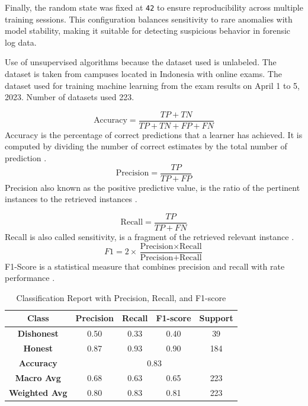 Finally, the random state was fixed at \texttt{42} to ensure reproducibility across multiple training sessions. This configuration balances sensitivity to rare anomalies with model stability, making it suitable for detecting suspicious behavior in forensic log data.


Use of unsupervised algorithms because the dataset used is unlabeled. The dataset is taken from campuses located in Indonesia with online exams. The dataset used for training machine learning from the exam results on April 1 to 5, 2023. Number of datasets used 223.

\begin{equation}
    \text{Accuracy} = \frac{TP + TN}{TP + TN + FP + FN}
\end{equation}
Accuracy is the percentage of correct predictions that a learner has achieved. It is computed by dividing the number of correct estimates by the total number of prediction \citet{smirani2022algorithm}.
\begin{equation}
    \text{Precision} = \frac{TP}{TP + FP}
\end{equation}
Precision also known as the positive predictive value, is the ratio of the pertinent instances to the retrieved instances \citet{smirani2022algorithm}.

\begin{equation}
    \text{Recall} = \frac{TP}{TP + FN}
\end{equation}
Recall is also called sensitivity, is a fragment of the retrieved relevant instance \citet{smirani2022algorithm}.
\begin{equation}
    F1 = 2 \times \frac{\text{Precision} \times \text{Recall}}{\text{Precision} + \text{Recall}}
\end{equation}
F1-Score is a statistical measure that combines precision and recall with rate performance \citet{smirani2022algorithm}.

\begin{table}[H]
    \centering
    \renewcommand{\arraystretch}{1.3} %
    \caption{Classification Report with Precision, Recall, and F1-score}
    \begin{tabular}{|c|c|c|c|c|}
        \hline
        \textbf{Class} & \textbf{Precision} & \textbf{Recall} & \textbf{F1-score} & \textbf{Support} \\
        \hline
        \textbf{Dishonest} & 0.50 & 0.33 & 0.40 & 39 \\
        \textbf{Honest}  & 0.87 & 0.93 & 0.90 & 184 \\
        \hline
        \textbf{Accuracy}  & \multicolumn{4}{c|}{0.83} \\
        \hline
        \textbf{Macro Avg} & 0.68 & 0.63 & 0.65 & 223 \\
        \textbf{Weighted Avg} & 0.80 & 0.83 & 0.81 & 223 \\
        \hline
    \end{tabular}
    \label{tab:classification_report}
\end{table}

